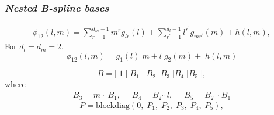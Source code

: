 \documentclass[12pt]{beamer}
\newcommand{\ms}{\scriptscriptstyle}
\begin{document}
%
%
%



\begin{frame}
\frametitle{\emph{Nested B-spline bases}}

\begin{align*}
 \phi_{\ms{12}}\left(l,m\right)  =   \sum_{r=1}^{\ms{d_m-1}} m^{\ms r}g_{\ms lr}\left(l\right) +  \sum_{r^\prime=1}^{\ms{d_l-1}} l^{\ms r^\prime}  g_{\ms mr^\prime}\left(m\right)+ h\left( l,m \right),
\end{align*}
\noindent
For $d_l = d_m = 2$,
\[
 \phi_{\ms{12}}\left(l,m\right)  = g_{\ms 1}\left(l\right) \; m+ l \; g_{\ms 2}\left(m\right) + \; h\left( l,m \right) 
\]

\begin{equation} \label{eq:nested-SANOVA-basis-matrix}
B = \big[  \; 1 \; \vert \;  B_1  \; \vert \;   B_2 \; \vert  B_3 \; \vert B_4 \; \vert B_5 \; \big],
\end{equation}
\noindent
where
\[
\begin{array}{ccc}
B_{\ms 3} = m \; \square \;  B_{\ms 1}, \;\; & B_{\ms 4}  = B_{\ms 2}  \square \; l, \;\; &  B_{\ms 5}= B_{\ms 2} \;\square \; B_{\ms 1} 
\end{array}
\]
\begin{equation*} \label{eq:PSANOVA-penalty}
P = \mbox{blockdiag}\left(0,\; P_1, \; P_2, \; P_{3},\; P_4, \; P_{5} \right),
\end{equation*}

\end{frame}
\end{document}
